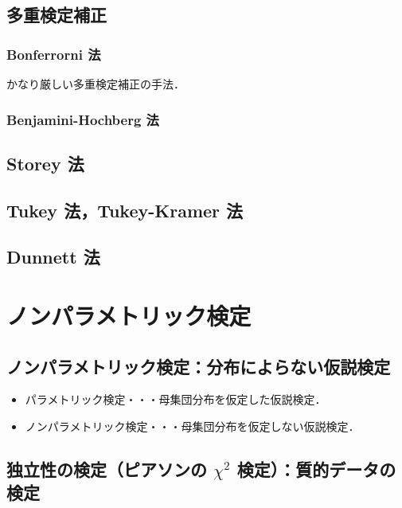 \section{多重検定補正}
\subsection{Bonferrorni 法}

かなり厳しい多重検定補正の手法．

\subsection{Benjamini-Hochberg 法}


\section{Storey 法}
\section{Tukey 法，Tukey-Kramer 法}
\section{Dunnett 法}


\chapter{ノンパラメトリック検定}

\section{ノンパラメトリック検定：分布によらない仮説検定}

\begin{itemize}
  \item パラメトリック検定・・・母集団分布を仮定した仮説検定．
  \item ノンパラメトリック検定・・・母集団分布を仮定しない仮説検定．
\end{itemize}

\section{独立性の検定（ピアソンの $\chi^{2}$ 検定）：質的データの検定}

